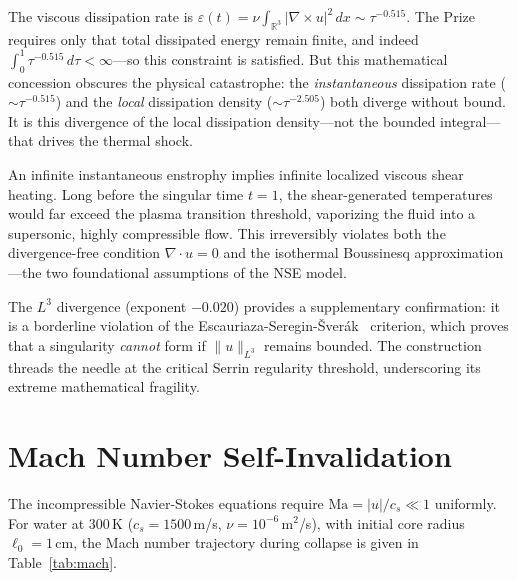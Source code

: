 \documentclass[11pt,a4paper]{article}
\begin{document}
The viscous dissipation rate is $\varepsilon(t) = \nu \int_{\mathbb{R}^3} |\nabla \times u|^2\,dx
\sim \tau^{-0.515}$. The Prize requires only that total dissipated energy remain finite, and
indeed $\int_0^1 \tau^{-0.515}\,d\tau < \infty$---so this constraint is satisfied. But this
mathematical concession obscures the physical catastrophe: the \emph{instantaneous} dissipation
rate ($\sim\tau^{-0.515}$) and the \emph{local} dissipation density ($\sim\tau^{-2.505}$) both
diverge without bound. It is this divergence of the local dissipation density---not the bounded
integral---that drives the thermal shock.

An infinite instantaneous enstrophy implies infinite localized viscous shear heating. Long before
the singular time $t = 1$, the shear-generated temperatures would far exceed the plasma transition
threshold, vaporizing the fluid into a supersonic, highly compressible flow. This irreversibly
violates both the divergence-free condition $\nabla \cdot u = 0$ and the isothermal Boussinesq
approximation---the two foundational assumptions of the NSE model.

The $L^3$ divergence (exponent $-0.020$) provides a supplementary confirmation: it is a borderline
violation of the Escauriaza-Seregin-\v{S}ver\'{a}k~\cite{ESS2003} criterion, which proves that a
singularity \emph{cannot} form if $\|u\|_{L^3}$ remains bounded. The construction threads the
needle at the critical Serrin regularity threshold, underscoring its extreme mathematical fragility.

\section{Mach Number Self-Invalidation}

The incompressible Navier-Stokes equations require $\text{Ma} = |u|/c_s \ll 1$ uniformly. For
water at 300\,K ($c_s = 1500$\,m/s, $\nu = 10^{-6}$\,m$^2$/s), with initial core radius
$\ell_0 = 1$\,cm, the Mach number trajectory during collapse is given in Table~\ref{tab:mach}.
\end{document}
